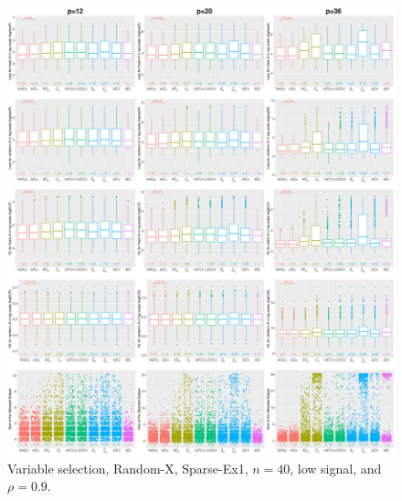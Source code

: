 \begin{figure}[!ht]
\centering
\includegraphics[width=\textwidth]{figures/supplement/randomx/subset_selection/Sparse-Ex1_n40_lsnr_rho09.eps}
\caption{Variable selection, Random-X, Sparse-Ex1, $n=40$, low signal, and $\rho=0.9$.}
\end{figure}
\clearpage
